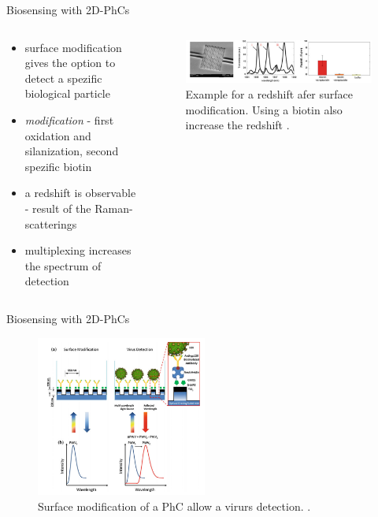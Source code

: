 \begin{frame}{Biosensing with 2D-PhCs}
  \begin{columns}

  \begin{column}{0.49\textwidth}
    \begin{itemize}
    \setlength\itemsep{1.2em}
    \item{ surface modification gives the option to detect a spezific biological particle}
    \item{ \emph{modification} - first oxidation and silanization, second spezific biotin}
    \item { a redshift is observable - result of the Raman-scatterings}
    \item{ multiplexing increases the spectrum of detection}
  \end{itemize}
  \end{column}

  \begin{column}{0.49\textwidth}
  \begin{figure}
    \centering
    \includegraphics[width=1\textwidth]{./bilder/redshift_example.png}
    \caption{Example for a redshift afer surface modification. Using a biotin also increase the redshift \cite{nano}.}
    \label{fig: redshift}
  \end{figure}
\end{column}
\end{columns}
\end{frame}
\begin{frame}{Biosensing with 2D-PhCs}
  \begin{figure}
    \centering
    \includegraphics[width=0.5\textwidth]{./bilder/reflektion.png}
    \caption{Surface modification of a PhC allow a virurs detection. \cite{nano}.}
    \label{fig: virus detection}
  \end{figure}

\end{frame}

